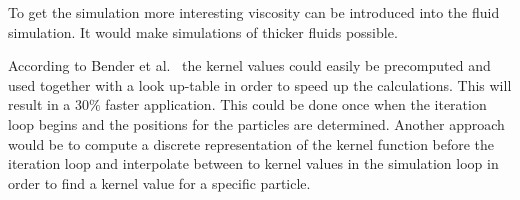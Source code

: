     To get the simulation more interesting viscosity can be introduced into the fluid simulation.
    It would make simulations of thicker fluids possible.

    According to Bender et al.~\cite{bender} the kernel values could easily be precomputed and used together with a look up-table in order to speed up the calculations. This will result in a $30\%$ faster application.  This could be done once when the iteration loop begins and the positions for the particles are determined. Another approach would be to compute a discrete representation of the kernel function before the iteration loop and interpolate between to kernel values in the simulation loop in order to find a kernel value for a specific particle. 






